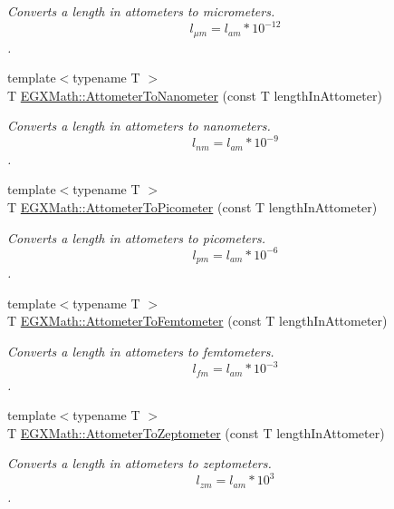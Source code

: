 \begin{DoxyCompactItemize}
\begin{DoxyCompactList}\small\item\em Converts a length in attometers to micrometers. \[ l_{\mu m}=l_{am} * 10^{-12} \]. \end{DoxyCompactList}\item 
{\footnotesize template$<$typename T $>$ }\\T \mbox{\hyperlink{group___e_g_x_math-_conversions-_length_conversions-_s_i-_attometer-_s_i_gacb010bf3c4fb120c4a43cf16c7d9c77f}{E\+G\+X\+Math\+::\+Attometer\+To\+Nanometer}} (const T length\+In\+Attometer)
\begin{DoxyCompactList}\small\item\em Converts a length in attometers to nanometers. \[ l_{nm}=l_{am} * 10^{-9} \]. \end{DoxyCompactList}\item 
{\footnotesize template$<$typename T $>$ }\\T \mbox{\hyperlink{group___e_g_x_math-_conversions-_length_conversions-_s_i-_attometer-_s_i_ga46ccf47b501bffeb16bc792377e55991}{E\+G\+X\+Math\+::\+Attometer\+To\+Picometer}} (const T length\+In\+Attometer)
\begin{DoxyCompactList}\small\item\em Converts a length in attometers to picometers. \[ l_{pm}=l_{am} * 10^{-6} \]. \end{DoxyCompactList}\item 
{\footnotesize template$<$typename T $>$ }\\T \mbox{\hyperlink{group___e_g_x_math-_conversions-_length_conversions-_s_i-_attometer-_s_i_gafbaa622bc31794c382e244942fa1d445}{E\+G\+X\+Math\+::\+Attometer\+To\+Femtometer}} (const T length\+In\+Attometer)
\begin{DoxyCompactList}\small\item\em Converts a length in attometers to femtometers. \[ l_{fm}=l_{am} * 10^{-3} \]. \end{DoxyCompactList}\item 
{\footnotesize template$<$typename T $>$ }\\T \mbox{\hyperlink{group___e_g_x_math-_conversions-_length_conversions-_s_i-_attometer-_s_i_ga88493321ed49951744e5afe2b0bf7e5c}{E\+G\+X\+Math\+::\+Attometer\+To\+Zeptometer}} (const T length\+In\+Attometer)
\begin{DoxyCompactList}\small\item\em Converts a length in attometers to zeptometers. \[ l_{zm}=l_{am} * 10^{3} \]. \end{DoxyCompactList}\item 

\end{DoxyCompactItemize}
